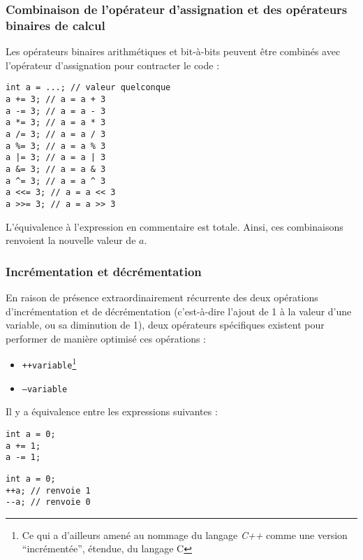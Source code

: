 \documentclass[../../../main.tex]{subfiles}
\begin{document}
\subsubsection{Combinaison de l'opérateur d'assignation et des opérateurs binaires de calcul}
 \label{ssub:combinaison_de_l_op_rateur_d_assignation_et_des_op_rateurs_binaires_de_calcul}
Les opérateurs binaires arithmétiques et bit-à-bits peuvent être combinés avec l'opérateur d'assignation pour contracter le code :
\begin{verbatim}
int a = ...; // valeur quelconque
a += 3; // a = a + 3
a -= 3; // a = a - 3
a *= 3; // a = a * 3
a /= 3; // a = a / 3
a %= 3; // a = a % 3
a |= 3; // a = a | 3
a &= 3; // a = a & 3
a ^= 3; // a = a ^ 3
a <<= 3; // a = a << 3
a >>= 3; // a = a >> 3
\end{verbatim}
L'équivalence à l'expression en commentaire est totale. Ainsi, ces combinaisons renvoient la nouvelle valeur de $a$.
 
\subsubsection{Incrémentation et décrémentation}
\label{ssub:incr_mentation_et_d_cr_mentation}
En raison de présence extraordinairement récurrente des deux opérations d'incrémentation et de décrémentation (c'est-à-dire l'ajout de 1 à la valeur d'une variable, ou sa diminution de 1), deux opérateurs spécifiques existent pour performer de manière optimisé ces opérations :
\begin{itemize}
	\item \texttt{++variable}\footnote{Ce qui a d'ailleurs amené au nommage du langage \textit{C++} comme une version ``incrémentée'', étendue, du langage C}
	\item \texttt{--variable}
\end{itemize}
Il y a équivalence entre les expressions suivantes :
 
\begin{minipage}{0.5\textwidth}
\begin{verbatim}
int a = 0;
a += 1;
a -= 1;
\end{verbatim}
\end{minipage}
\begin{minipage}{0.5\textwidth}
\begin{verbatim}
int a = 0;
++a; // renvoie 1
--a; // renvoie 0
\end{verbatim}
\end{minipage}
\end{document}
